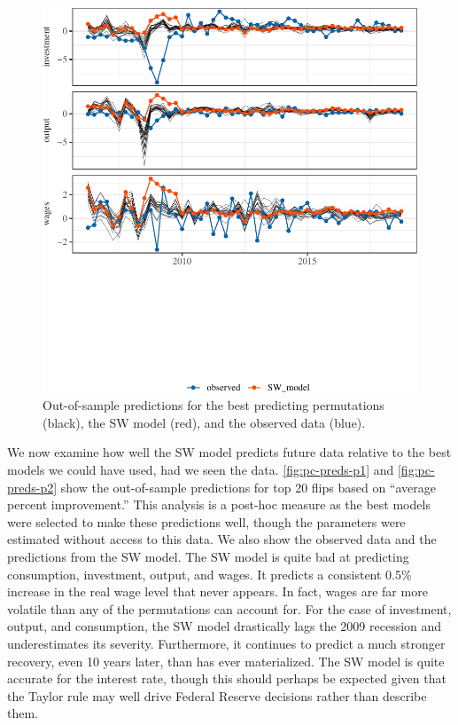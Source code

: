 \documentclass[11pt]{article}
\begin{document}
\begin{figure}[t]

{\centering \includegraphics{gfx/pc-preds-p2-1} 

}

\caption{Out-of-sample predictions for the best predicting permutations (black), the SW model (red), and the observed data (blue).}\label{fig:pc-preds-p2}
\end{figure}

We now examine how well the SW model predicts future data relative to
the best models we could have used, had we seen the data.
\autoref{fig:pc-preds-p1} and \autoref{fig:pc-preds-p2} show the
out-of-sample predictions for top 20 flips based on ``average percent
improvement.'' This analysis is a post-hoc measure as the best models
were selected to make these predictions well, though the parameters were
estimated without access to this data. We also show the observed data
and the predictions from the SW model. The SW model is quite bad at
predicting consumption, investment, output, and wages. It predicts a
consistent 0.5\% increase in the real wage level that never appears. In
fact, wages are far more volatile than any of the permutations can
account for. For the case of investment, output, and consumption, the SW
model drastically lags the 2009 recession and underestimates its
severity. Furthermore, it continues to predict a much stronger recovery,
even 10 years later, than has ever materialized. The SW model is quite
accurate for the interest rate, though this should perhaps be expected
given that the Taylor rule may well drive Federal Reserve decisions
rather than describe them.
\end{document}
